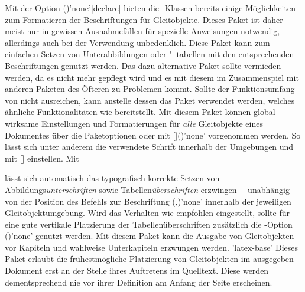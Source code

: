 \begin{DeclarePackages}[Gleitobjekte|?]
  Mit der Option ()'none'|declare| 
  bieten die \KOMAScript-Klassen bereits einige Möglichkeiten zum Formatieren 
  der Beschriftungen für Gleitobjekte. Dieses Paket ist daher meist nur in 
  gewissen Ausnahmefällen für spezielle Anweisungen notwendig, allerdings auch 
  bei der Verwendung unbedenklich.
  Diese Paket kann zum einfachen Setzen von Unterabbildungen oder "~tabellen 
  mit den entsprechenden Beschriftungen genutzt werden. Das dazu alternative 
  Paket  sollte vermieden werden, da es nicht mehr gepflegt 
  wird und es mit diesem im Zusammenspiel mit anderen Paketen des Öfteren zu 
  Problemen kommt. Sollte der Funktionsumfang von  nicht 
  ausreichen, kann anstelle dessen das Paket  verwendet 
  werden, welches ähnliche Funktionalitäten wie  bereitstellt.
  Mit diesem Paket können global wirksame Einstellungen und Formatierungen für 
  \emph{alle} Gleitobjekte eines Dokumentes über die Paketoptionen oder mit 
  [\MPValue{\dots}]()'none' vorgenommen 
  werden. So lässt sich unter anderem die verwendete Schrift innerhalb der 
  Umgebungen  und  mit
  [] einstellen. Mit 
  \begin{Code}
  \end{Code}\vspace{-\baselineskip}%
  lässt sich automatisch das typografisch korrekte Setzen von 
  Abbildungs\emph{unterschriften} sowie Tabellen\emph{überschriften} 
  erzwingen~-- unabhängig von der Position des Befehls zur Beschriftung 
  (,)'none' 
  innerhalb der jeweiligen Gleitobjektumgebung. Wird das Verhalten wie  
  empfohlen eingestellt, sollte für eine gute vertikale Platzierung der 
  Tabellenüberschriften zusätzlich die 
  \KOMAScript-Option ()'none'
  genutzt werden.
  Mit diesem Paket kann die Ausgabe von Gleitobjekten vor Kapiteln und wahlweise
  Unterkapiteln erzwungen werden.
'latex-base'
  Dieses Paket erlaubt die frühestmögliche Platzierung von Gleitobjekten im 
  ausgegeben Dokument erst an der Stelle ihres Auftretens im Quelltext. Diese 
  werden dementsprechend nie vor ihrer Definition am Anfang der Seite 
  erscheinen.
\end{DeclarePackages}



